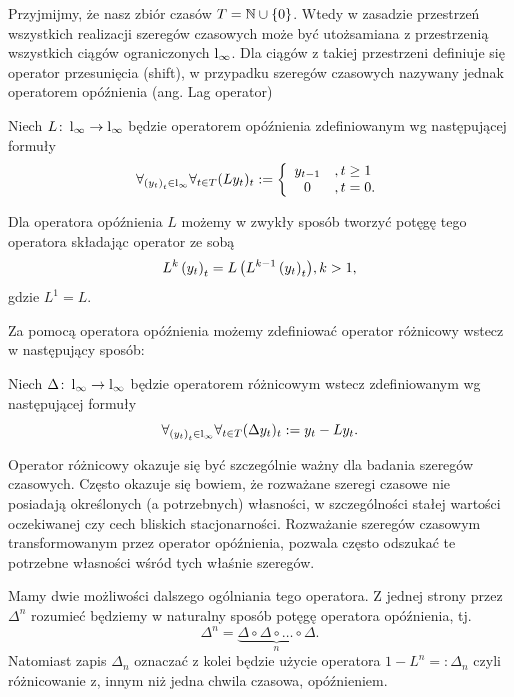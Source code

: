 \documentclass[10pt,a4paper]{book}
\begin{document}
Przyjmijmy, że nasz zbiór czasów $T = \mathbb{N} \cup \left\lbrace {0} \right\rbrace$. Wtedy w zasadzie przestrzeń wszystkich realizacji szeregów czasowych może być utożsamiana z przestrzenią wszystkich ciągów ograniczonych $\operatorname{l}_{\infty} $. Dla ciągów z takiej przestrzeni definiuje się operator przesunięcia (shift), w przypadku szeregów czasowych nazywany jednak operatorem opóźnienia (ang. Lag operator)

\begin{definition} 
Niech $L \colon \operatorname{l}_{\infty} \to \operatorname{l}_{\infty} $ będzie operatorem opóźnienia zdefiniowanym wg następującej formuły
$$
\forall_{\left( {y_t} \right)_{t}^{} \in \operatorname{l}_{\infty} }  \forall_{t \in T} (L y_t)_t := 
\left\lbrace \begin{array}{cl}
y_{t-1} &, t \geq 1\\
0&, t =0.
\end{array} \right. 
$$
\end{definition}

Dla operatora opóźnienia $L$ możemy w zwykły sposób tworzyć potęgę tego operatora składając operator ze sobą
$$
L^k \left( {y_t} \right)_{t}^{}  = {{L}\left( { L^{k-1} \left( {y_t} \right)_{t}^{} } \right)} , k > 1,
$$
gdzie $L^1 = L$.

Za pomocą operatora opóźnienia możemy zdefiniować operator różnicowy wstecz w następujący sposób:
\begin{definition} 
Niech $\Delta \colon \operatorname{l}_{\infty} \to \operatorname{l}_{\infty}$ będzie operatorem różnicowym wstecz zdefiniowanym wg następującej formuły
$$
\forall_{ \left( {y_t} \right)_{t}^{} \in \operatorname{l}_{\infty} } \forall_{t \in T} (\Delta y_t)_t := y_t - L y_t.
$$
\end{definition}

Operator różnicowy okazuje się być szczególnie ważny dla badania szeregów czasowych. Często okazuje się bowiem, że rozważane szeregi czasowe nie posiadają określonych (a potrzebnych) własności, w szczególności stałej wartości oczekiwanej czy cech bliskich stacjonarności. Rozważanie szeregów czasowym transformowanym przez operator opóźnienia, pozwala często odszukać te potrzebne własności wśród tych właśnie szeregów.

Mamy dwie możliwości dalszego ogólniania tego operatora. Z jednej strony przez $\Delta^n$ rozumieć będziemy w naturalny sposób potęgę operatora opóźnienia, tj.
$$
\Delta^n = \underbrace{\Delta \circ \Delta \circ \ldots \circ \Delta}_{n}.
$$
Natomiast zapis $\Delta_n$ oznaczać z kolei będzie użycie operatora $1 - L^n =: \Delta_n$ czyli różnicowanie z, innym niż jedna chwila czasowa, opóźnieniem.
\end{document}
